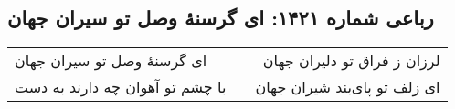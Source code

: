 \begin{center}
\section*{رباعی شماره ۱۴۲۱: ای گرسنهٔ وصل تو سیران جهان}
\label{sec:1421}
\begin{longtable}{l p{0.5cm} r}
ای گرسنهٔ وصل تو سیران جهان
&&
لرزان ز فراق تو دلیران جهان
\\
با چشم تو آهوان چه دارند به دست
&&
ای زلف تو پای‌بند شیران جهان
\\
\end{longtable}
\end{center}
